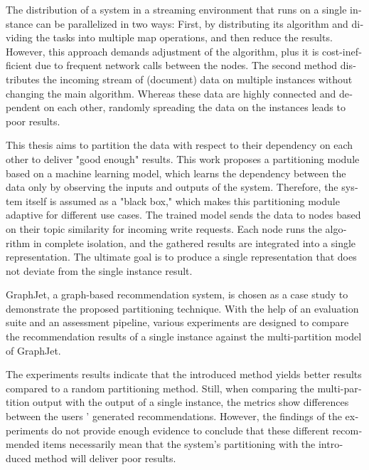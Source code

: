 
\null\vfil
\begin{otherlanguage}{english}
\begin{center}\textsf{\textbf{\abstractname}}\end{center}

\noindent
The distribution of a system in a streaming environment that runs on a single instance can be parallelized in two ways: First, by distributing its algorithm and dividing the tasks into multiple map operations, and then reduce the results. However, this approach demands adjustment of the algorithm, plus it is cost-inefficient due to frequent network calls between the nodes. The second method distributes the incoming stream of (document) data on multiple instances without changing the main algorithm. Whereas these data are highly connected and dependent on each other, randomly spreading the data on the instances leads to poor results.

This thesis aims to partition the data with respect to their dependency on each other to deliver "good enough" results. This work proposes a partitioning module based on a machine learning model, which learns the dependency between the data only by observing the inputs and outputs of the system. Therefore, the system itself is assumed as a "black box," which makes this partitioning module adaptive for different use cases. The trained model sends the data to nodes based on their topic similarity for incoming write requests. Each node runs the algorithm in complete isolation, and the gathered results are integrated into a single representation. The ultimate goal is to produce a single representation that does not deviate from the single instance result.

GraphJet, a graph-based recommendation system, is chosen as a case study to demonstrate the proposed partitioning technique. With the help of an evaluation suite and an assessment pipeline, various experiments are designed to compare the recommendation results of a single instance against the multi-partition model of GraphJet.


The experiments results indicate that the introduced method yields better results compared to a random partitioning method. Still, when comparing the multi-partition output with the output of a single instance, the metrics show differences between the users ' generated recommendations. However, the findings of the experiments do not provide enough evidence to conclude that these different recommended items necessarily mean that the system's partitioning with the introduced method will deliver poor results.


\end{otherlanguage}
\vfil\null
\newpage


